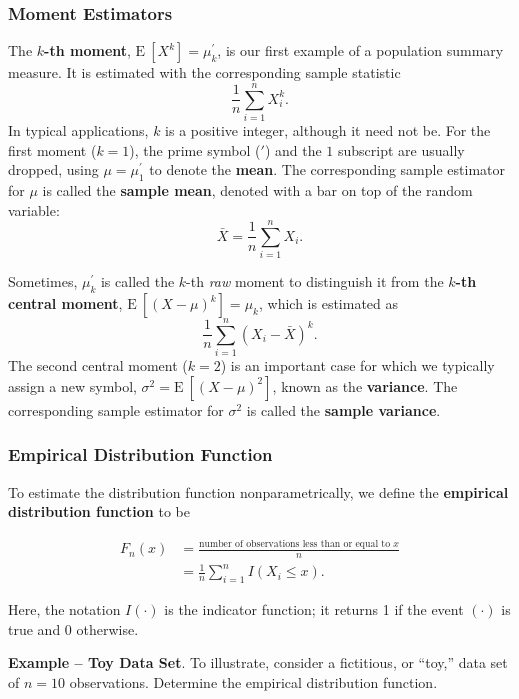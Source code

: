 \documentclass[]{book}
\theoremstyle{definition}
\theoremstyle{definition}
\theoremstyle{definition}
\theoremstyle{remark}
\begin{document}
\subsubsection{Moment Estimators}\label{S:MomentEstimator}

The \(k\)\textbf{-th moment}, \(\mathrm{E~}[X^k] = \mu^{\prime}_k\), is
our first example of a population summary measure. It is estimated with
the corresponding sample statistic \[\frac{1}{n} \sum_{i=1}^n X_i^k .\]
In typical applications, \(k\) is a positive integer, although it need
not be. For the first moment (\(k=1\)), the prime symbol (\(\prime\))
and the \(1\) subscript are usually dropped, using
\(\mu=\mu^{\prime}_1\) to denote the \textbf{mean}. The corresponding
sample estimator for \(\mu\) is called the \textbf{sample mean}, denoted
with a bar on top of the random variable:
\[\bar{X} =\frac{1}{n} \sum_{i=1}^n X_i .\]

Sometimes, \(\mu^{\prime}_k\) is called the \(k\)-th \emph{raw} moment
to distinguish it from the \(k\)\textbf{-th central moment},
\(\mathrm{E~} [(X-\mu)^k] = \mu_k\), which is estimated as
\[\frac{1}{n} \sum_{i=1}^n \left(X_i - \bar{X}\right)^k .\] The second
central moment (\(k=2\)) is an important case for which we typically
assign a new symbol, \(\sigma^2 = \mathrm{E~} [(X-\mu)^2]\), known as
the \textbf{variance}. The corresponding sample estimator for
\(\sigma^2\) is called the \textbf{sample variance}.

\subsubsection{Empirical Distribution
Function}\label{empirical-distribution-function}

To estimate the distribution function nonparametrically, we define the
\textbf{empirical distribution function} to be

\[\begin{aligned}
F_n(x) &=  \frac{\text{number of observations less than or equal to }x}{n} \\
&=  \frac{1}{n} \sum_{i=1}^n I\left(X_i \le x\right).
\end{aligned}\]

Here, the notation \(I(\cdot)\) is the indicator function; it returns 1
if the event \((\cdot)\) is true and 0 otherwise.

\textbf{Example -- Toy Data Set}. To illustrate, consider a fictitious,
or ``toy,'' data set of \(n=10\) observations. Determine the empirical
distribution function.
\end{document}
